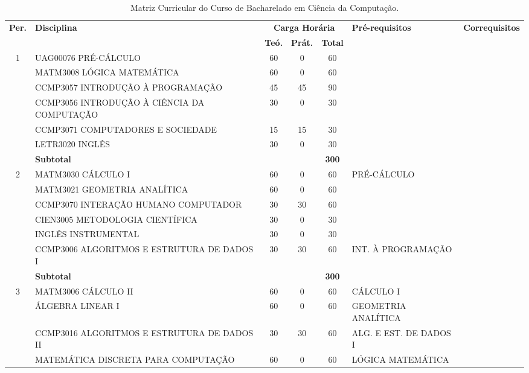 \begin{center}
  \begin{tiny}
    \begin{longtable}{cp{4.5cm}cccp{2.8cm}p{2.8cm}}
      \caption{\label{quadro:matriz-curricular-do-curso}Matriz Curricular do Curso de Bacharelado em Ciência da Computação.}\\
    \toprule
    \textbf{Per.} & \textbf{Disciplina} & \multicolumn{3}{c}{\textbf{Carga Horária}} & \textbf{Pré-requisitos} & \textbf{Correquisitos}\\
    & & \textbf{Teó.} & \textbf{Prát.} & \textbf{Total} & & \\
    \midrule
    1 & UAG00076 PRÉ-CÁLCULO & 60 & 0 & 60 & & \\ \cline{2-7}
      & MATM3008 LÓGICA MATEMÁTICA & 60 & 0 & 60  & &\\ \cline{2-7}
      & CCMP3057 INTRODUÇÃO À PROGRAMAÇÃO & 45 & 45 & 90  & &\\ \cline{2-7}
      & CCMP3056 INTRODUÇÃO À CIÊNCIA DA COMPUTAÇÃO & 30 & 0 & 30  & &\\ \cline{2-7}
      & CCMP3071 COMPUTADORES E SOCIEDADE & 15 & 15 & 30  & &\\ \cline{2-7}
      & LETR3020 INGLÊS & 30 & 0 & 30  & &\\ \midrule
      & \multicolumn{3}{l}{\textbf{Subtotal}} & \textbf{300} & & \\ \midrule
    2 & MATM3030 CÁLCULO I & 60 & 0 & 60 & PRÉ-CÁLCULO & \\ \cline{2-7}   
      & MATM3021 GEOMETRIA ANALÍTICA & 60 & 0 & 60 & & \\ \cline{2-7}
      & CCMP3070 INTERAÇÃO HUMANO COMPUTADOR & 30 & 30 & 60 & & \\ \cline{2-7}
      & CIEN3005 METODOLOGIA CIENTÍFICA & 30 & 0 & 30 & & \\ \cline{2-7}
      & INGLÊS INSTRUMENTAL & 30 & 0 & 30 &  \\ \cline{2-7}
      & CCMP3006 ALGORITMOS E ESTRUTURA DE DADOS I & 30 & 30 & 60 & INT. À PROGRAMAÇÃO & \\ \midrule
      & \multicolumn{3}{l}{\textbf{Subtotal}} & \textbf{300} & & \\ \midrule
    3 & MATM3006 CÁLCULO II & 60 & 0 & 60 & CÁLCULO I & \\ \cline{2-7}
      & ÁLGEBRA LINEAR I & 60 & 0 & 60 & GEOMETRIA ANALÍTICA & \\ \cline{2-7}
      & CCMP3016 ALGORITMOS E ESTRUTURA DE DADOS II & 30 & 30 & 60 & ALG. E EST. DE DADOS I & \\ \cline{2-7}
      & MATEMÁTICA DISCRETA PARA COMPUTAÇÃO & 60 & 0 & 60 & LÓGICA MATEMÁTICA & \\ \cline{2-7}

\end{longtable}
\end{tiny}
\end{center}

